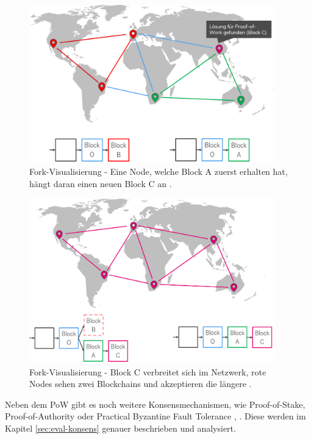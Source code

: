 \begin{figure}[!htbp]
  \centering
	\includegraphics[width=0.95\textwidth,angle=0]{images/fork_3}
 	\caption{Fork-Visualisierung - Eine Node, welche Block A zuerst erhalten hat, hängt daran einen neuen Block C an \cite[S.~200 ff.]{AntonopoulosMasteringbitcoin2015}.}
	\label{fig:fork_3}
\end{figure}

\begin{figure}[!htbp]
  \centering
	\includegraphics[width=0.95\textwidth,angle=0]{images/fork_4}
 	\caption{Fork-Visualisierung - Block C verbreitet sich im Netzwerk, rote Nodes sehen zwei Blockchains und akzeptieren die längere \cite[S.~200 ff.]{AntonopoulosMasteringbitcoin2015}.}
	\label{fig:fork_4}
\end{figure}

Neben dem \acs{PoW} gibt es noch weitere Konsensmechanismen, wie Proof-of-Stake, Proof-of-Authority oder Practical Byzantine Fault Tolerance \cite{SukhwaniPerformanceModelingPBFT2017a}, \cite{DeAngelisPBFTvsproofofauthority2017} . Diese werden im Kapitel \ref{sec:eval-konsens} genauer beschrieben und analysiert.

